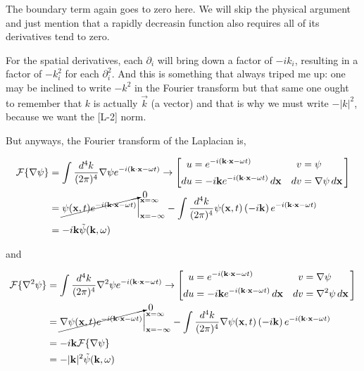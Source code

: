 The boundary term again goes to zero here.
We will skip the physical argument and just mention that a rapidly decreasin function also requires all of its derivatives
tend to zero.



For the spatial derivatives, each $\partial_i$ will bring down a factor of $-i k_i$, resulting in a factor of
$- k_{i}^2$ for each $\partial_{i}^{2}$.
And this is something that always triped me up: one may be inclined to write $-k^2$ in the Fourier transform
but that same one ought to remember that $k$ is actually $\vec{k}$ (a vector) and that is why we must
write $-|k|^2$, because we want the [L-2] norm.

But anyways, the Fourier transform of the Laplacian is,

\begin{align*}
\mathcal{F}\{ \nabla \psi \} &=
    \int \frac{d^4k}{(2\pi)^4} \nabla \psi e^{-i(\boldsymbol{\mathbf{k}}\cdot\boldsymbol{\mathbf{x}} - \omega t)}
\rightarrow
\left[
    \begin{alignedat}{2}
        u  &= e^{-i(\boldsymbol{\mathbf{k}}\cdot\boldsymbol{\mathbf{x}} - \omega t)}                          \quad & v  &= \psi \\
        du &= -i\boldsymbol{\mathbf{k}} e^{-i(\boldsymbol{\mathbf{k}}\cdot\boldsymbol{\mathbf{x}} - \omega t)} \, d\boldsymbol{\mathbf{x}}  \quad & dv &= \nabla \psi \, d\boldsymbol{\mathbf{x}}
    \end{alignedat}\,
\right] \\
&= \cancelto{0}{ \psi(\boldsymbol{\mathbf{x}}, t) e^{-i(\boldsymbol{\mathbf{k}}\cdot\boldsymbol{\mathbf{x}} - \omega t)} } \Big|_{\boldsymbol{\mathbf{x}}=-\infty}^{\boldsymbol{\mathbf{x}}=\infty}
    - \int \frac{d^4k}{(2\pi)^4} \psi(\boldsymbol{\mathbf{x}}, t) \left(-i\boldsymbol{\mathbf{k}}\right) e^{-i(\boldsymbol{\mathbf{k}}\cdot\boldsymbol{\mathbf{x}} - \omega t)} \\
&= -i\boldsymbol{\mathbf{k}} \tilde{\psi} (\boldsymbol{\mathbf{k}}, \omega)
\end{align*}


and

\begin{align*}
\mathcal{F}\{ \nabla^2 \psi \} &=
    \int \frac{d^4k}{(2\pi)^4} \nabla^2 \psi e^{-i(\boldsymbol{\mathbf{k}}\cdot\boldsymbol{\mathbf{x}} - \omega t)}
\rightarrow
\left[
    \begin{alignedat}{2}
        u  &= e^{-i(\boldsymbol{\mathbf{k}}\cdot\boldsymbol{\mathbf{x}} - \omega t)}                          \quad & v  &= \nabla \psi \\
        du &= -i\boldsymbol{\mathbf{k}} e^{-i(\boldsymbol{\mathbf{k}}\cdot\boldsymbol{\mathbf{x}} - \omega t)} \, d\boldsymbol{\mathbf{x}}  \quad & dv &= \nabla^2 \psi \, d\boldsymbol{\mathbf{x}}
    \end{alignedat}\,
\right] \\
&= \cancelto{0}{ \nabla\psi(\boldsymbol{\mathbf{x}}, t) e^{-i(\boldsymbol{\mathbf{k}}\cdot\boldsymbol{\mathbf{x}} - \omega t)} } \Big|_{\boldsymbol{\mathbf{x}}=-\infty}^{\boldsymbol{\mathbf{x}}=\infty}
    - \int \frac{d^4k}{(2\pi)^4} \nabla\psi(\boldsymbol{\mathbf{x}}, t) \left(-i\boldsymbol{\mathbf{k}}\right) e^{-i(\boldsymbol{\mathbf{k}}\cdot\boldsymbol{\mathbf{x}} - \omega t)} \\
&= -i\boldsymbol{\mathbf{k}} \mathcal{F}\{ \nabla \psi \} \\
&= - |\boldsymbol{\mathbf{k}}|^2 \tilde{\psi} (\boldsymbol{\mathbf{k}}, \omega)
\end{align*}



